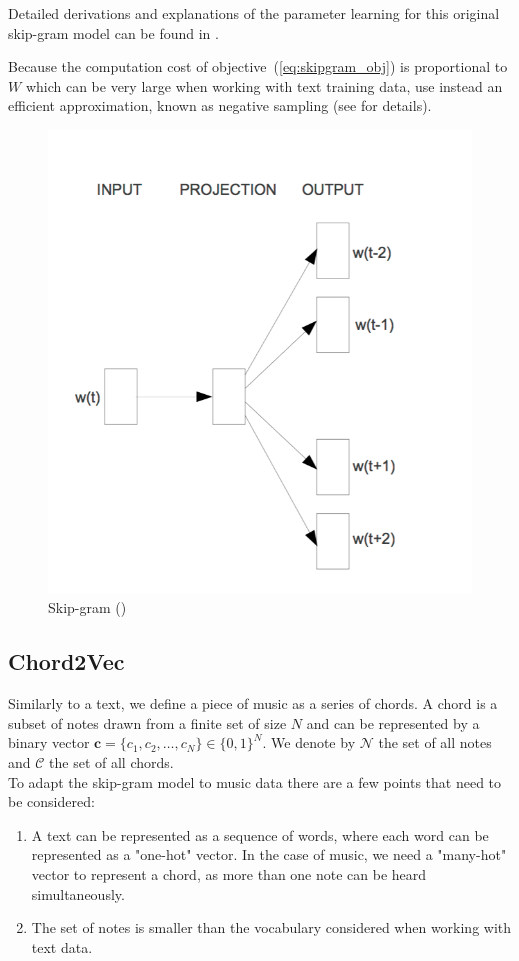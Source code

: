 \documentclass[12pt]{article}\pagestyle{myheadings}
\newcommand{\boldc}{\boldsymbol c}
\begin{document}
Detailed derivations and explanations of the parameter learning for this original skip-gram model can be found in \citep{Rong14}.

Because the computation cost of objective~(\ref{eq:skipgram_obj}) is proportional to $W$ which can be very large when working with text training data, \citet{mik2013} use instead an efficient approximation, known as negative sampling (see \citep{NIPS2013_5021} for details). 

\begin{figure}[ht]
\centering
\includegraphics[width=.7\linewidth]{figures/skipgram.png}
\caption{\label{fig:skipgram}Skip-gram (\citet{mik2013})}
\end{figure}


\subsection{Chord2Vec}
Similarly to a text, we define a piece of music as a series of chords. A chord is a subset of notes drawn from a finite set of size $N$ and can be represented by a binary vector $\boldc = \{c_1, c_2, \ldots, c_N\}\in \{0,1\}^N$. We denote by $\mathcal{N}$ the set of all notes and $\mathcal{C}$ the set of all chords.\\
\noindent To adapt the skip-gram model to music data there are a few points that need to be considered:

\begin{enumerate}
\item A text can be represented as a sequence of words, where each word can be represented as a "one-hot" vector. In the case of music, we need a "many-hot" vector to represent a chord, as more than one note can be heard simultaneously.  
\item The set of notes is smaller than the vocabulary considered when working with text data.
\end{enumerate}
 
\end{document}

